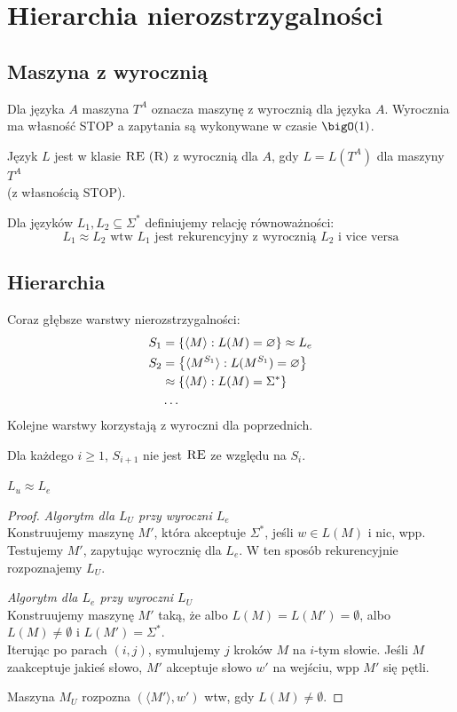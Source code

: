 \section{Hierarchia nierozstrzygalności}

\subsection{Maszyna z wyrocznią}
Dla języka \(A\) maszyna \(T^A\) oznacza maszynę z wyrocznią dla języka \(A\). Wyrocznia ma własność STOP a zapytania są wykonywane w czasie \(\bigO(1)\).

Język \(L\) jest w klasie \(\textsc{RE} \ (\textsc{R})\) z wyrocznią dla \(A\), gdy \(L = L(T^A)\) dla maszyny \(T^A\) \\ (z własnością STOP).

Dla języków \(L_1, L_2 \subseteq \Sigma^*\) definiujemy relację równoważności:
\[ L_1 \approx L_2 \text{ wtw } L_1 \text{ jest rekurencyjny z wyrocznią } L_2 \text{ i vice versa} \]

\subsection{Hierarchia}
Coraz głębsze warstwy nierozstrzygalności:
\begin{align*}
    S_1 & = \set{\langle M \rangle : L(M) = \emptyset} \approx L_e \\
    S_2 & = \set{\langle M^{S_1} \rangle : L(M^{S_1}) = \emptyset} \\
    & \approx \set{\langle M \rangle : L(M) = \Sigma^*} \\
    & \dots
\end{align*}
Kolejne warstwy korzystają z wyroczni dla poprzednich.

Dla każdego \(i \geq 1\), \(S_{i+1}\) nie jest \(\textsc{RE}\) ze względu na \(S_i\).

\newpage
\begin{theorem}
    \(L_u \approx L_e\)
\end{theorem}
\begin{proof}
    \textit{Algorytm dla \(L_U\) przy wyroczni \(L_e\)} \\
    Konstruujemy maszynę \(M'\), która akceptuje \(\Sigma^*\), jeśli \(w \in L(M)\) i nic, wpp. Testujemy \(M'\), zapytując wyrocznię dla \(L_e\). W ten sposób rekurencyjnie rozpoznajemy \(L_U\).

    \textit{Algorytm dla \(L_e\) przy wyroczni \(L_U\)} \\
    Konstruujemy maszynę \(M'\) taką, że albo \(L(M) = L(M') = \emptyset\), albo \(L(M) \neq \emptyset\) i \(L(M') = \Sigma^*\). \\
    Iterując po parach \((i,j)\), symulujemy \(j\) kroków \(M\) na \(i\)-tym słowie. Jeśli \(M\) zaakceptuje jakieś słowo, \(M'\) akceptuje słowo \(w'\) na wejściu, wpp \(M'\) się pętli.

    Maszyna \(M_U\) rozpozna \((\langle M' \rangle, w')\) wtw, gdy \(L(M) \neq \emptyset\).
\end{proof}

